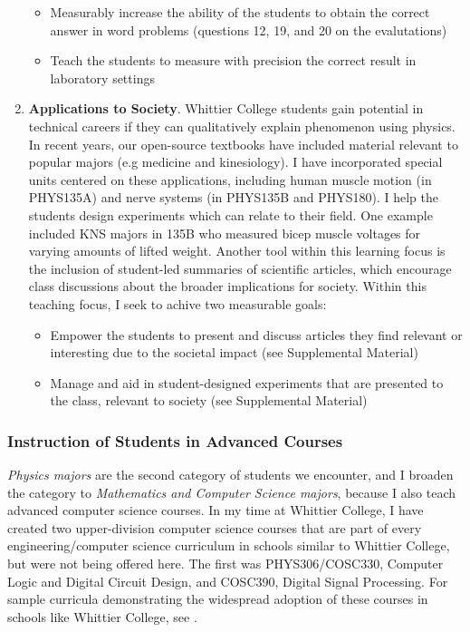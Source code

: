 \documentclass[../../main.tex]{subfiles}
\begin{document}
\begin{enumerate}
\begin{itemize}
\item Measurably increase the ability of the students to obtain the correct answer in word problems (questions 12, 19, and 20 on the evalutations)
\item Teach the students to measure with precision the correct result in laboratory settings 
\end{itemize}

\item \textbf{Applications to Society}. Whittier College students gain potential in technical careers if they can qualitatively explain phenomenon using physics.  In recent years, our open-source textbooks \cite{openstax1} \cite{openstax2} have included material relevant to popular majors (e.g medicine and kinesiology). I have incorporated special units centered on these applications, including human muscle motion (in PHYS135A) and nerve systems (in PHYS135B and PHYS180).  I help the students design experiments which can relate to their field.  One example included KNS majors in 135B who measured bicep muscle voltages for varying amounts of lifted weight.  Another tool within this learning focus is the inclusion of student-led summaries of scientific articles, which encourage class discussions about the broader implications for society.  Within this teaching focus, I seek to achive two measurable goals:

\begin{itemize}
\item Empower the students to present and discuss articles they find relevant or interesting due to the societal impact (see Supplemental Material)
\item Manage and aid in student-designed experiments that are presented to the class, relevant to society (see Supplemental Material)
\end{itemize}

\end{enumerate}

\subsubsection{Instruction of Students in Advanced Courses}

\label{sec:teaching_phil2}

\textit{Physics majors} are the second category of students we encounter, and I broaden the category to \textit{Mathematics and Computer Science majors}, because I also teach advanced computer science courses.  In my time at Whittier College, I have created two upper-division computer science courses that are part of every engineering/computer science curriculum in schools similar to Whittier College, but were not being offered here.  The first was PHYS306/COSC330, Computer Logic and Digital Circuit Design, and COSC390, Digital Signal Processing.  For sample curricula demonstrating the widespread adoption of these courses in schools like Whittier College, see \cite{BiolaCR} \cite{LMUCR}. \\ \hspace{0.1cm}
\end{document}
